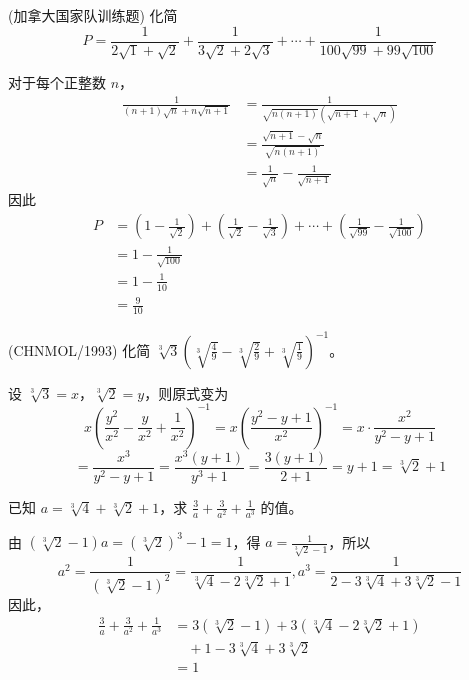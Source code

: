 \begin{questions}
\question (加拿大国家队训练题) 化简
\[
P = \frac{1}{2\sqrt{1} + \sqrt{2}} + \frac{1}{3\sqrt{2} + 2\sqrt{3}} + \cdots + \frac{1}{100\sqrt{99} + 99\sqrt{100}}
\]

\begin{solution}
对于每个正整数 $n$，
\begin{align*}
\frac{1}{(n + 1)\sqrt{n} + n\sqrt{n + 1}} &= \frac{1}{\sqrt{n(n + 1)}(\sqrt{n + 1} + \sqrt{n})} \\
&= \frac{\sqrt{n + 1} - \sqrt{n}}{\sqrt{n(n + 1)}} \\
&= \frac{1}{\sqrt{n}} - \frac{1}{\sqrt{n + 1}}
\end{align*}
因此
\begin{align*}
P &= \left( 1 - \frac{1}{\sqrt{2}} \right) + \left( \frac{1}{\sqrt{2}} - \frac{1}{\sqrt{3}} \right) + \cdots + \left( \frac{1}{\sqrt{99}} - \frac{1}{\sqrt{100}} \right) \\
&= 1 - \frac{1}{\sqrt{100}} \\
&= 1 - \frac{1}{10} \\
&= \frac{9}{10}
\end{align*}
\end{solution}

\question (CHNMOL/1993) 化简 $\sqrt[3]{3}\left(\sqrt[3]{\frac{4}{9}}-\sqrt[3]{\frac{2}{9}}+\sqrt[3]{\frac{1}{9}}\right)^{-1}$。
\begin{solution}
设 $\sqrt[3]{3}=x$，$\sqrt[3]{2}=y$，则原式变为
\[
x\left(\frac{y^2}{x^2}-\frac{y}{x^2}+\frac{1}{x^2}\right)^{-1}=x\left(\frac{y^2-y+1}{x^2}\right)^{-1}=x\cdot \frac{x^2}{y^2-y+1}
\]
\[
=\frac{x^3}{y^2-y+1}=\frac{x^3\left(y+1\right)}{y^3+1}=\frac{3\left(y+1\right)}{2+1}=y+1=\sqrt[3]{2}+1
\]
\end{solution}

\question 已知 $a=\sqrt[3]{4}+\sqrt[3]{2}+1$，求 $\frac{3}{a}+\frac{3}{a^2}+\frac{1}{a^3}$ 的值。
\begin{solution}
由 $\left(\sqrt[3]{2}-1\right)a=\left(\sqrt[3]{2}\right)^3-1=1$，得 $a=\frac{1}{\sqrt[3]{2}-1}$，所以
\[
a^2=\frac{1}{\left(\sqrt[3]{2}-1\right)^2}=\frac{1}{\sqrt[3]{4}-2\sqrt[3]{2}+1}, a^3=\frac{1}{2-3\sqrt[3]{4}+3\sqrt[3]{2}-1}
\]
因此，
\begin{align*}
\frac{3}{a}+\frac{3}{a^2}+\frac{1}{a^3} &= 3\left(\sqrt[3]{2}-1\right)+3\left(\sqrt[3]{4}-2\sqrt[3]{2}+1\right) \\
&\quad +1-3\sqrt[3]{4}+3\sqrt[3]{2} \\
&= 1
\end{align*}
\end{solution}


\end{questions}
